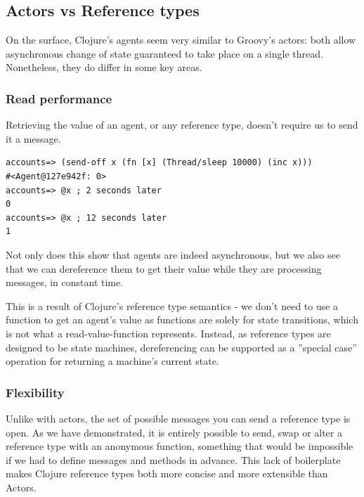 \documentclass[a4paper,12pt]{kth-mag}
\begin{document}
\subsection{Actors vs Reference types}

On the surface, Clojure's agents seem very similar to Groovy's actors: both allow asynchronous change of state guaranteed to take place on a single thread. Nonetheless, they do differ in some key areas.

\subsubsection{Read performance}

Retrieving the value of an agent, or any reference type, doesn't require us to send it a message. 

\begin{listing}[H]
	\begin{verbatim}
accounts=> (send-off x (fn [x] (Thread/sleep 10000) (inc x)))
#<Agent@127e942f: 0>
accounts=> @x ; 2 seconds later
0
accounts=> @x ; 12 seconds later
1
	\end{verbatim}
\end{listing}

Not only does this show that agents are indeed asynchronous, but we also see that we can dereference them to get their value while they are processing messages, in constant time.

This is a result of Clojure's reference type semantics - we don't need to use a function to get an agent's value as functions are solely for state transitions, which is not what a read-value-function represents. Instead, as reference types are designed to be state machines, dereferencing can be supported as a ''special case'' operation for returning a machine's current state.

\subsubsection{Flexibility}

Unlike with actors, the set of possible messages you can send a reference type is open. As we have demonstrated, it is entirely possible to send, swap or alter a reference type with an anonymous function, something that would be impossible if we had to define messages and methods in advance. This lack of boilerplate makes Clojure reference types both more concise and more extensible than Actors.
\end{document}
